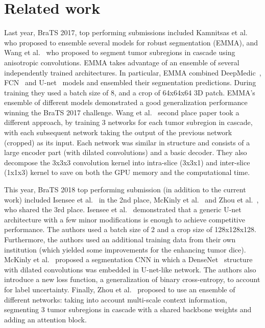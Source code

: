 \documentclass[runningheads]{llncs}
\begin{document}
\section{Related work}
\label{sec:relatedwork}

Last year, BraTS 2017, top performing submissions included Kamnitsas et al.~\cite{Kamnitsas17} who proposed to ensemble several models for robust segmentation (EMMA), and  Wang et al.~\cite{Wang17} who proposed to segment tumor subregions in cascade using anisotropic convolutions. EMMA takes advantage of an ensemble of several independently trained architectures. In particular, EMMA combined DeepMedic~\cite{Kamnitsas16}, FCN~\cite{Long15} and U-net~\cite{Ronneberger15} models and ensembled their segmentation predictions. During training they used a batch size of 8, and a crop of 64x64x64 3D patch. EMMA's ensemble of different models demonstrated a good generalization performance winning the BraTS 2017 challenge. Wang et al.~\cite{Wang17} second place paper took a different approach, by training 3 networks for each tumor subregion in cascade, with each subsequent network taking the output of the previous network (cropped) as its input.  Each network was similar in structure and consists of a large encoder part (with dilated convolutions) and a basic decoder. They also decompose the 3x3x3 convolution kernel into intra-slice (3x3x1) and inter-slice (1x1x3) kernel to save on both the GPU memory and the computational time. 

This year, BraTS 2018 top performing submission (in addition to the current work) included Isensee et al.~\cite{Isensee18brats} in the 2nd place, McKinly et al.~\cite{McKinley18brats} and Zhou et al.~\cite{Zhou18brats}, who shared the 3rd place.  Isensee et al.~\cite{Isensee18brats} demonstrated that a generic U-net architecture with a few  minor modifications is enough to achieve competitive performance. 
 The authors used a batch size of 2 and a crop size of 128x128x128. Furthermore, the authors used an additional training data from their own institution (which yielded some improvements for the enhancing tumor dice).
 McKinly et al.~\cite{McKinley18brats} proposed a segmentation CNN in which a DenseNet~\cite{huang2017densely} structure with dilated convolutions was embedded in U-net-like network.  The authors also introduce a new loss function, a generalization of binary cross-entropy, to account for label uncertainty. Finally, Zhou et al.~\cite{Zhou18brats} proposed to use an ensemble of different networks: taking into account multi-scale context information,  segmenting 3 tumor subregions in cascade with a shared backbone weights and adding an attention block.  
\end{document}
